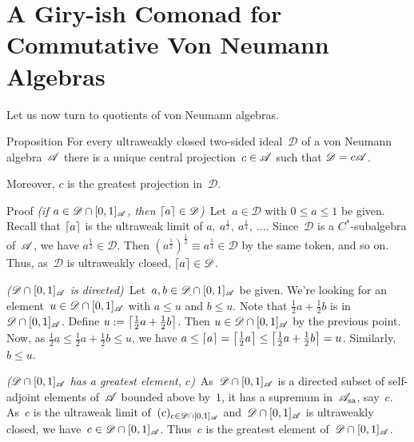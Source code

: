 \documentclass[main]{subfiles}
\begin{document}
\chapter{A Giry-ish Comonad for Commutative Von Neumann Algebras}

\begin{parsec}%
\begin{point}%
Let us now turn to quotients of von Neumann algebras.

\end{point}
\begin{point}{Proposition}%
\label{prop:weakly-closed-ideal}
For every ultraweakly closed two-sided
ideal~$\mathscr{D}$ of a von Neumann algebra~$\mathscr{A}$
there is a unique central projection~$c\in\mathscr{A}$
such that $\mathscr{D} = c\mathscr{A}$.

Moreover, $c$ is the greatest projection in~$\mathscr{D}$.
\begin{point}{Proof}%
\emph{(if $a\in \mathscr{D}\cap [0,1]_{\mathscr{A}}$, 
then $\left\lceil a\right\rceil\in\mathscr{D}$)}\ 
Let~$a\in\mathscr{D}$ with $0\leq a \leq 1$
be given.
Recall that $\left\lceil a\right\rceil$
is the ultraweak limit of $a,\ a^{\frac{1}{2}},\ a^{\frac{1}{4}},\ \dotsc$.
Since~$\mathscr{D}$ is a $C^*$-subalgebra of~$\mathscr{A}$,
we have $a^{\frac{1}{2}}\in \mathscr{D}$.
Then $(a^{\frac{1}{2}})^{\frac{1}{2}} \equiv a^{\frac{1}{4}}\in \mathscr{D}$
by the same token,
and so on.
Thus, as~$\mathscr{D}$ is ultraweakly closed, $\left\lceil a\right\rceil\in\mathscr{D}$.

\emph{($\mathscr{D}\cap [0,1]_{\mathscr{A}}$ is directed)}\ 
Let~$a,b\in \mathscr{D}\cap[0,1]_{\mathscr{A}}$ be given.
We're looking for an element~$u\in \mathscr{D}\cap[0,1]_{\mathscr{A}}$
with $a\leq u$ and $b\leq u$.
Note that $\frac{1}{2}a + \frac{1}{2}b$
is in~$\mathscr{D}\cap[0,1]_{\mathscr{A}}$.
Define
$u:=\left\lceil\frac{1}{2}a+\frac{1}{2}b\right\rceil$.
Then  $u\in \mathscr{D}\cap[0,1]_{\mathscr{A}}$
by the previous point.
Now, 
as $\frac{1}{2}a \leq \frac{1}{2}a+\frac{1}{2}b \leq u$,
we have $a \leq \left\lceil a\right\rceil =\left\lceil\frac{1}{2}a\right\rceil \leq 
\left\lceil \frac{1}{2}a+\frac{1}{2}b\right\rceil = u$.
Similarly, $b\leq u$.


\emph{($\mathscr{D}\cap [0,1]_{\mathscr{A}}$
has a greatest element, $c$)}\ 
As~$\mathscr{D}\cap[0,1]_{\mathscr{A}}$
is a directed subset of self-adjoint elements 
of~$\mathscr{A}$ bounded above by~$1$,
it has a supremum in~$\mathscr{A}_\mathrm{sa}$,
say~$c$.
As~$c$ is the ultraweak limit of~$(c)_{c\in \mathscr{D}\cap[0,1]_{\mathscr{A}}}$
and~$\mathscr{D}\cap[0,1]_{\mathscr{A}}$ is ultraweakly closed,
we have~$c\in \mathscr{D}\cap[0,1]_{\mathscr{A}}$.
Thus~$c$ is the greatest element of~$\mathscr{D}\cap[0,1]_{\mathscr{A}}$.


\end{point}
\end{point}
\end{parsec}
\end{document}
